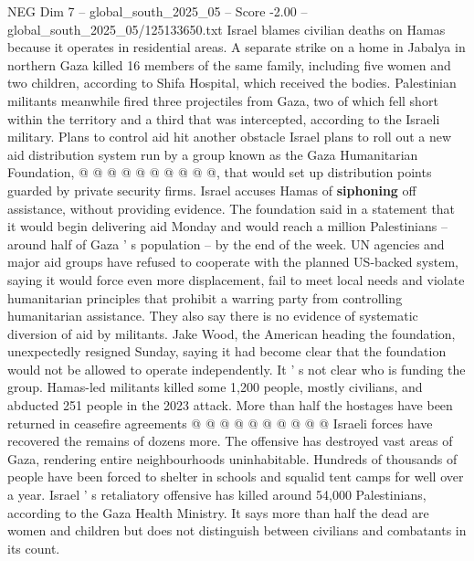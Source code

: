 \begin{textsample}{NEG Dim 7 – global\_south\_2025\_05 – Score -2.00 – global\_south\_2025\_05/125133650.txt}
Israel blames civilian deaths on Hamas because it operates in residential areas.
A separate strike on a home in Jabalya in northern Gaza killed 16 members of the same family, including five women and two children, according to Shifa Hospital, which received the bodies.
Palestinian militants meanwhile fired three projectiles from Gaza, two of which fell short within the territory and a third that was intercepted, according to the Israeli military.
Plans to control aid hit another obstacle Israel plans to roll out a new aid distribution system run by a group known as the Gaza Humanitarian Foundation, @ @ @ @ @ @ @ @ @ @, that would set up distribution points guarded by private security firms.
Israel accuses Hamas of \textbf{siphoning} off assistance, without providing evidence.
The foundation said in a statement that it would begin delivering aid Monday and would reach a million Palestinians -- around half of Gaza ' s population -- by the end of the week.
UN agencies and major aid groups have refused to cooperate with the planned US-backed system, saying it would force even more displacement, fail to meet local needs and violate humanitarian principles that prohibit a warring party from controlling humanitarian assistance.
They also say there is no evidence of systematic diversion of aid by militants.
Jake Wood, the American heading the foundation, unexpectedly resigned Sunday, saying it had become clear that the foundation would not be allowed to operate independently.
It ' s not clear who is funding the group.
Hamas-led militants killed some 1,200 people, mostly civilians, and abducted 251 people in the 2023 attack.
More than half the hostages have been returned in ceasefire agreements @ @ @ @ @ @ @ @ @ @ Israeli forces have recovered the remains of dozens more.
The offensive has destroyed vast areas of Gaza, rendering entire neighbourhoods uninhabitable.
Hundreds of thousands of people have been forced to shelter in schools and squalid tent camps for well over a year.
Israel ' s retaliatory offensive has killed around 54,000 Palestinians, according to the Gaza Health Ministry.
It says more than half the dead are women and children but does not distinguish between civilians and combatants in its count.

\end{textsample}
